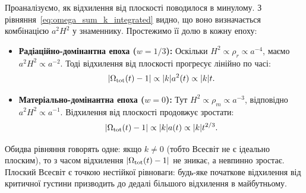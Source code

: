 Проаналізуємо, як відхилення від плоскості поводилося в минулому.
З рівняння~\eqref{eq:omega_sum_k_integrated} видно, що воно визначається
комбінацією $a^2 H^2$ у знаменнику. Простежимо її долю в кожну епоху:
\begin{itemize}
  \item \textbf{Радіаційно-домінантна епоха ($w = 1/3$):} Оскільки $H^2 \propto \rho_r \propto a^{-4}$, маємо $a^2 H^2 \propto a^{-2}$. Тоді відхилення від плоскості прогресує лінійно по часі:
  \begin{equation}\label{eq:omega_evolution_r_new}
    |\Omega_{\rm tot}(t) - 1| \propto |k|a^2(t) \propto |k|t.
  \end{equation}
  \item \textbf{Матеріально-домінантна епоха ($w = 0$):} Тут $H^2 \propto \rho_m \propto a^{-3}$, відповідно $a^2 H^2 \propto a^{-1}$. Відхилення від плоскості продовжує зростати:
  \begin{equation}\label{eq:omega_evolution_m_new}
    |\Omega_{\rm tot}(t) - 1| \propto |k|a(t) \propto |k|t^{2/3}.
  \end{equation}
\end{itemize}

Обидва рівняння говорять одне: якщо $k \neq 0$ (тобто Всесвіт не є ідеально плоским), то з часом відхилення $|\Omega_{\rm tot}(t)-1|$ не зникає, а невпинно зростає. Плоский Всесвіт є точкою нестійкої рівноваги: будь-яке початкове відхилення від критичної густини призводить до дедалі більшого відхилення в майбутньому.


